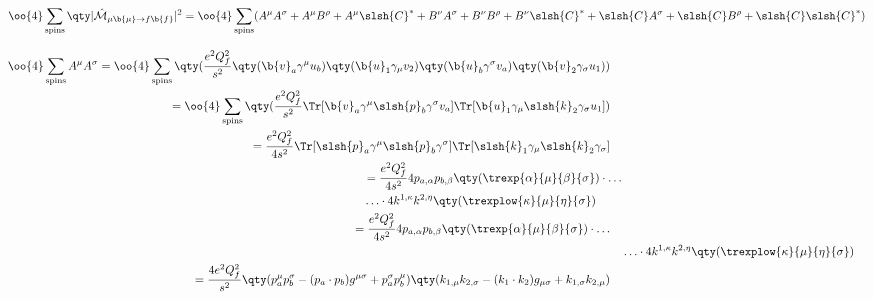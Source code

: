 \begin{equation}
	\oo{4}\sum_\text{spins}\qty|\hat{\mathcal{M}}_{\mu\b{\mu}\rightarrow{f\b{f}}}|^2=
	\oo{4}\sum_\text{spins}(
	  A^\mu A^\sigma + A^\mu B^\rho + A^\mu \slsh{C}^*
	+ B^\nu A^\sigma + B^\nu B^\rho + B^\nu \slsh{C}^*
	+ \slsh{C}A^\sigma+\slsh{C}B^\rho+\slsh{C}\slsh{C}^*)
\end{equation}

\newpage

	\begin{align}
		\begin{split}
			\oo{4}\sum_\text{spins}A^\mu A^\sigma 
			&=\oo{4}\sum_\text{spins}
			\qty(\frac{e^2Q_f^2}{s^2}\qty(\b{v}_a\gamma^\mu u_b)\qty(\b{u}_1\gamma_\mu v_2)
			\qty(\b{u}_b\gamma^\sigma v_a)\qty(\b{v}_2\gamma_\sigma u_1))
		\end{split}
		\\
		\begin{split}
			&=
			\oo{4}\sum_\text{spins}\qty(\frac{e^2Q_f^2}{s^2}\Tr[\b{v}_a\gamma^\mu \slsh{p}_b\gamma^\sigma v_a]
			\Tr[\b{u}_1\gamma_\mu \slsh{k}_2\gamma_\sigma u_1])
		\end{split}
		\\ 
		\begin{split}
			&=
			\frac{e^2Q_f^2}{4s^2}\Tr[\slsh{p}_a\gamma^\mu \slsh{p}_b\gamma^\sigma]
			\Tr[\slsh{k}_1\gamma_\mu \slsh{k}_2\gamma_\sigma]
		\end{split}
		\\
		\begin{split}
			&=
			\frac{e^2Q_f^2}{4s^2}
			4p_{a,\alpha}p_{b,\beta}\qty(\trexp{\alpha}{\mu}{\beta}{\sigma})\cdot\ldots
			\\
			&\ldots\cdot4k^{1,\kappa}k^{2,\eta}\qty(\trexplow{\kappa}{\mu}{\eta}{\sigma})
		\end{split}
		\\
		\begin{split}
			&=
			\frac{e^2Q_f^2}{4s^2}
			4p_{a,\alpha}p_{b,\beta}\qty(\trexp{\alpha}{\mu}{\beta}{\sigma})\cdot\ldots
		\end{split}
		\\
		&\ldots\cdot4k^{1,\kappa}k^{2,\eta}\qty(\trexplow{\kappa}{\mu}{\eta}{\sigma})
		\\
		\begin{split}
			&=\frac{4e^2Q_f^2}{s^2}
			\qty(p_a^\mu p_b^\sigma   -   (p_a\cdot p_b)g^{\mu\sigma}   +   p_a^\sigma p_b^\mu)
			\qty(k_{1,\mu}k_{2,\sigma}   -   (k_1\cdot k_2)g_{\mu\sigma}   +   k_{1,\sigma}k_{2,\mu})
		\end{split}

\end{align}
